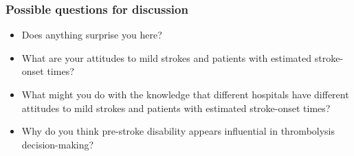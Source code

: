 \documentclass{beamer}
\begin{document}
\begin{frame}
\frametitle{Possible questions for discussion}

\begin{itemize}
    \item Does anything surprise you here?
    \item What are your attitudes to mild strokes and patients with estimated stroke-onset times?
    \item What might you do with the knowledge that different hospitals have different attitudes to mild strokes and patients with estimated stroke-onset times?
    \item Why do you think pre-stroke disability appears influential in thrombolysis decision-making?
\end{itemize}

\end{frame}
\end{document}
